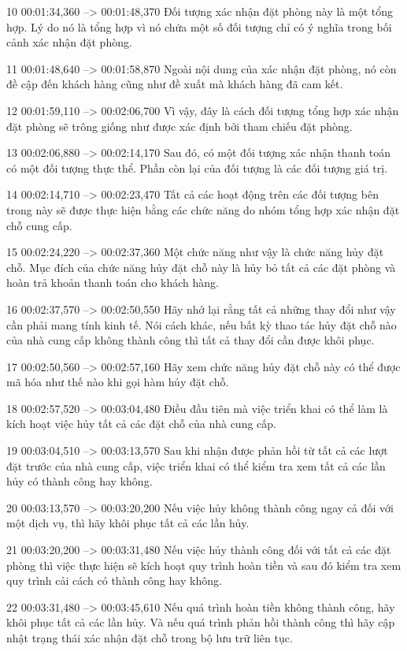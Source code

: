 10
00:01:34,360 --> 00:01:48,370
Đối tượng xác nhận đặt phòng này là một tổng hợp.  Lý do nó là tổng hợp vì nó chứa một số đối tượng chỉ có ý nghĩa trong bối cảnh xác nhận đặt phòng.

11
00:01:48,640 --> 00:01:58,870
Ngoài nội dung của xác nhận đặt phòng, nó còn đề cập đến khách hàng cũng như đề xuất mà khách hàng đã cam kết.

12
00:01:59,110 --> 00:02:06,700
Vì vậy, đây là cách đối tượng tổng hợp xác nhận đặt phòng sẽ trông giống như được xác định bởi tham chiếu đặt phòng.

13
00:02:06,880 --> 00:02:14,170
Sau đó, có một đối tượng xác nhận thanh toán có một đối tượng thực thể.  Phần còn lại của đối tượng là các đối tượng giá trị.

14
00:02:14,710 --> 00:02:23,470
Tất cả các hoạt động trên các đối tượng bên trong này sẽ được thực hiện bằng các chức năng do nhóm tổng hợp xác nhận đặt chỗ cung cấp.

15
00:02:24,220 --> 00:02:37,360
Một chức năng như vậy là chức năng hủy đặt chỗ.  Mục đích của chức năng hủy đặt chỗ này là hủy bỏ tất cả các đặt phòng và hoàn trả khoản thanh toán cho khách hàng.

16
00:02:37,570 --> 00:02:50,550
Hãy nhớ lại rằng tất cả những thay đổi như vậy cần phải mang tính kinh tế.  Nói cách khác, nếu bất kỳ thao tác hủy đặt chỗ nào của nhà cung cấp không thành công thì tất cả thay đổi cần được khôi phục.

17
00:02:50,560 --> 00:02:57,160
Hãy xem chức năng hủy đặt chỗ này có thể được mã hóa như thế nào khi gọi hàm hủy đặt chỗ.

18
00:02:57,520 --> 00:03:04,480
Điều đầu tiên mà việc triển khai có thể làm là kích hoạt việc hủy tất cả các đặt chỗ của nhà cung cấp.

19
00:03:04,510 --> 00:03:13,570
Sau khi nhận được phản hồi từ tất cả các lượt đặt trước của nhà cung cấp, việc triển khai có thể kiểm tra xem tất cả các lần hủy có thành công hay không.

20
00:03:13,570 --> 00:03:20,200
Nếu việc hủy không thành công ngay cả đối với một dịch vụ, thì hãy khôi phục tất cả các lần hủy.

21
00:03:20,200 --> 00:03:31,480
Nếu việc hủy thành công đối với tất cả các đặt phòng thì việc thực hiện sẽ kích hoạt quy trình hoàn tiền và sau đó kiểm tra xem quy trình cải cách có thành công hay không.

22
00:03:31,480 --> 00:03:45,610
Nếu quá trình hoàn tiền không thành công, hãy khôi phục tất cả các lần hủy.  Và nếu quá trình phản hồi thành công thì hãy cập nhật trạng thái xác nhận đặt chỗ trong bộ lưu trữ liên tục.

